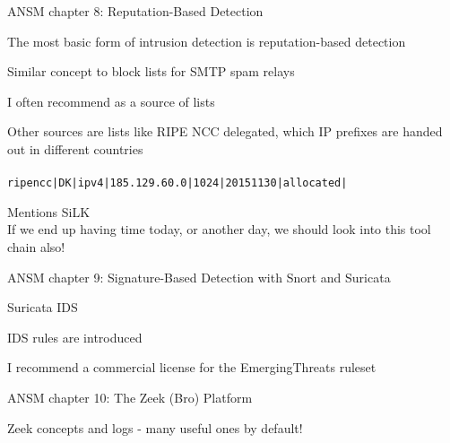 \documentclass[Screen16to9,17pt]{foils}
\begin{document}


\begin{list1}
\item ANSM chapter 8: Reputation-Based Detection
\begin{list2}
\item The most basic form of intrusion detection is reputation-based detection
\item Similar concept to block lists for SMTP spam relays
\item I often recommend  as a source of lists
\item Other sources are lists like RIPE NCC delegated, which IP prefixes are handed out in different countries\\
\\
\verb+ripencc|DK|ipv4|185.129.60.0|1024|20151130|allocated|+
\item Mentions SiLK \\
If we end up having time today, or another day, we should look into this tool chain also!
\end{list2}
\end{list1}





\begin{list1}
\item ANSM chapter 9: Signature-Based Detection with Snort and Suricata
\begin{list2}
\item Suricata IDS
\item IDS rules are introduced
\item I recommend a commercial license for the EmergingThreats ruleset
\end{list2}
\end{list1}



\begin{list1}
\item ANSM chapter 10: The Zeek (Bro) Platform
\begin{list2}
\item Zeek concepts and logs - many useful ones by default!
\end{list2}
\end{list1}
\end{document}
